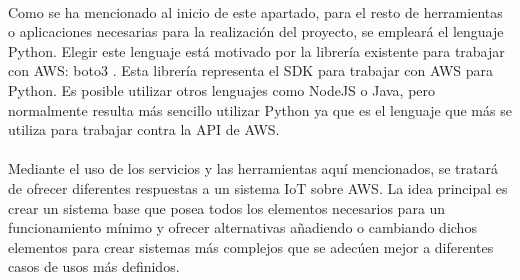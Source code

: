 \documentclass[../../memoria.tex]{subfiles}
\begin{document}
\paragraph{}
Como se ha mencionado al inicio de este apartado, para el resto de herramientas o aplicaciones necesarias para la realización del proyecto, se empleará el lenguaje Python. Elegir este lenguaje está motivado por la librería existente para trabajar con AWS: boto3 \cite{boto3}. Esta librería representa el SDK para trabajar con AWS para Python. Es posible utilizar otros lenguajes como NodeJS o Java, pero normalmente resulta más sencillo utilizar Python ya que es el lenguaje que más se utiliza para trabajar contra la API de AWS.

\paragraph{}
Mediante el uso de los servicios y las herramientas aquí mencionados, se tratará de ofrecer diferentes respuestas a un sistema IoT sobre AWS. La idea principal es crear un sistema base que posea todos los elementos necesarios para un funcionamiento mínimo y ofrecer alternativas añadiendo o cambiando dichos elementos para crear sistemas más complejos que se adecúen mejor a diferentes casos de usos más definidos.
\end{document}
